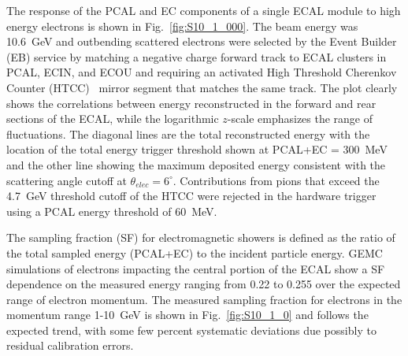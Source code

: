 The response of the PCAL and EC components of a single ECAL module to high energy electrons is shown in
Fig.~\ref{fig:S10_1_000}. The beam energy was 10.6~GeV and outbending scattered electrons were selected by
the Event Builder (EB) service by matching a negative charge forward track to ECAL clusters in PCAL, ECIN, and
ECOU and requiring an activated High Threshold Cherenkov Counter (HTCC)~\cite{nim:htcc} mirror segment that
matches the same track. The plot clearly shows the correlations between energy reconstructed in the forward
and rear sections of the ECAL, while the logarithmic $z$-scale emphasizes the range of fluctuations. The diagonal
lines are the total reconstructed  energy with the location of the total energy trigger threshold shown at PCAL+EC =
300~MeV and the other line showing the maximum deposited energy consistent with the scattering angle cutoff at
$\theta_{elec}=6^\circ$. Contributions from pions that exceed the 4.7~GeV threshold cutoff of the HTCC were
rejected in the hardware trigger using a PCAL energy threshold of 60~MeV.

The sampling fraction (SF) for electromagnetic showers is defined as the ratio of the total sampled energy
(PCAL+EC) to the incident particle energy. GEMC simulations of electrons impacting the central portion of the ECAL
show a SF dependence on the measured energy ranging from 0.22 to 0.255 over the expected range of electron
momentum. The measured sampling fraction for electrons in the momentum range 1-10~GeV is shown in
Fig.~\ref{fig:S10_1_0} and follows the expected trend, with some few percent systematic deviations due possibly
to residual calibration errors.

